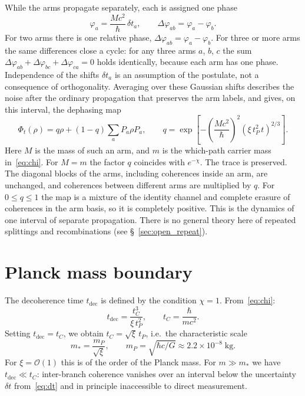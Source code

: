 \documentclass[11pt,a4paper]{article}
\begin{document}
While the arms propagate separately, each is assigned one phase
\begin{equation}
\varphi_a=\frac{Mc^2}{\hbar}\,\delta t_a,
\qquad
\Delta\varphi_{ab}=\varphi_a-\varphi_b.
\label{eq:arm_phase}
\end{equation}
For two arms there is one relative phase, $\Delta\varphi_{ab}=\varphi_a-\varphi_b$. For three or more arms the same differences close a cycle: for any three arms $a$, $b$, $c$ the sum $\Delta\varphi_{ab}+\Delta\varphi_{bc}+\Delta\varphi_{ca}=0$ holds identically, because each arm has one phase. Independence of the shifts $\delta t_a$ is an assumption of the postulate, not a consequence of orthogonality. Averaging over these Gaussian shifts describes the noise after the ordinary propagation that preserves the arm labels, and gives, on this interval, the dephasing map
\begin{equation}
\Phi_t(\rho)=q\rho+(1-q)\sum_a P_a\rho P_a,
\qquad
q=\exp\!\left[-\left(\frac{Mc^2}{\hbar}\right)^2
(\xi\,t_P^2\,t)^{2/3}\right].
\label{eq:phi_map}
\end{equation}
Here $M$ is the mass of such an arm, and $m$ is the which-path carrier mass in~\eqref{eq:chi}. For $M=m$ the factor $q$ coincides with $e^{-\chi}$. The trace is preserved. The diagonal blocks of the arms, including coherences inside an arm, are unchanged, and coherences between different arms are multiplied by $q$. For $0\le q\le 1$ the map is a mixture of the identity channel and complete erasure of coherences in the arm basis, so it is completely positive. This is the dynamics of one interval of separate propagation. There is no general theory here of repeated splittings and recombinations (see \S~\ref{sec:open_repeat}).

\section{Planck mass boundary}\label{sec:planck}

The decoherence time $t_{\mathrm{dec}}$ is defined by the condition $\chi=1$. From~\eqref{eq:chi}:
\begin{equation}
t_{\mathrm{dec}}=\frac{t_C^3}{\xi\,t_P^2},
\qquad
t_C=\frac{\hbar}{mc^2}.
\label{eq:tdec}
\end{equation}
Setting $t_{\mathrm{dec}}=t_C$, we obtain $t_C=\sqrt{\xi}\,t_P$, i.e.\ the characteristic scale
\begin{equation}
m_\ast=\frac{m_P}{\sqrt{\xi}},
\qquad
m_P=\sqrt{\hbar c/G}\approx 2.2\times10^{-8}\;\text{kg}.
\end{equation}
For $\xi=\mathcal O(1)$ this is of the order of the Planck mass. For $m\gg m_\ast$ we have $t_{\mathrm{dec}}\ll t_C$: inter-branch coherence vanishes over an interval below the uncertainty $\delta t$ from~\eqref{eq:dt} and in principle inaccessible to direct measurement.
\end{document}
